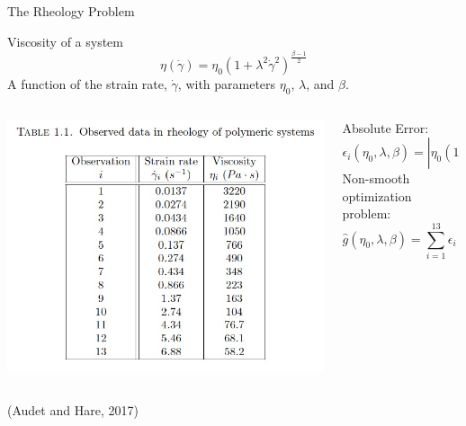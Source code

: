 \documentclass{beamer}
\begin{document}
\begin{frame}{The Rheology Problem}
\begin{block}{Viscosity of a system}
$$\eta(\dot{\gamma}) = \eta_0(1+\lambda^2\dot{\gamma}^2)^{\frac{\beta -1}{2}}$$
A function of the strain rate, $\dot{\gamma}$, with parameters $\eta_0$, $\lambda$, and $\beta$.
\end{block}
\begin{columns}
	\begin{column}{0.45\linewidth}
		\centering
		\includegraphics[width=0.95\linewidth]{Data}
	\end{column}
	\begin{column}{0.53\linewidth}
		Absolute Error:
		$$\epsilon_i(\eta_0, \lambda, \beta) = |\eta_0(1+\lambda^2\dot{\gamma}^2)^{\frac{\beta -1}{2}} - \eta_i|$$
		Non-smooth optimization problem:
		$$\hat{g}(\eta_0, \lambda, \beta) = \sum\limits_{i=1}^{13}\epsilon_i(\eta_0, \lambda, \beta)$$
	\end{column}
\end{columns}
\hfill \tiny (Audet and Hare, 2017)
\end{frame}
\end{document}
